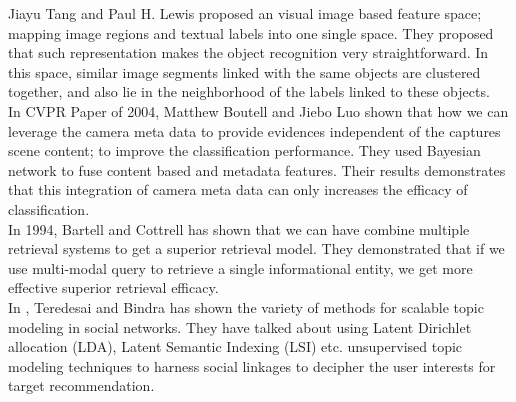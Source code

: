 \hspace*{1cm} Jiayu Tang and Paul H. Lewis \cite{tang} proposed an visual image based feature space; mapping  image regions and textual labels into one single space. They proposed that such representation makes the object recognition very straightforward. In this space, similar image segments linked with the same objects are clustered together, and also lie in the neighborhood of the labels linked to these objects.\\
\hspace*{1cm} In CVPR Paper\cite{Boutell2005935} of 2004, Matthew Boutell and Jiebo Luo shown that how we can leverage the camera meta data to provide evidences independent of the captures scene content; to improve the classification performance. They used Bayesian network to fuse content based and metadata features. Their results demonstrates that this integration of camera meta data can only increases the efficacy of classification.\\
\hspace*{1cm} In 1994, Bartell and Cottrell \cite{Bartell:1994:ACM:188490.188554} has shown that we can have combine multiple retrieval systems to get a superior retrieval model. They demonstrated that if we use multi-modal query to retrieve a single informational entity, we get more effective superior retrieval efficacy.\\
\hspace*{1cm} In \cite{socialLDA}, Teredesai and Bindra has shown the variety of methods for scalable topic modeling in social networks.  They have talked about using  Latent Dirichlet allocation (LDA), Latent Semantic Indexing (LSI) etc. unsupervised topic modeling techniques to  harness social linkages to decipher the user interests for target recommendation.